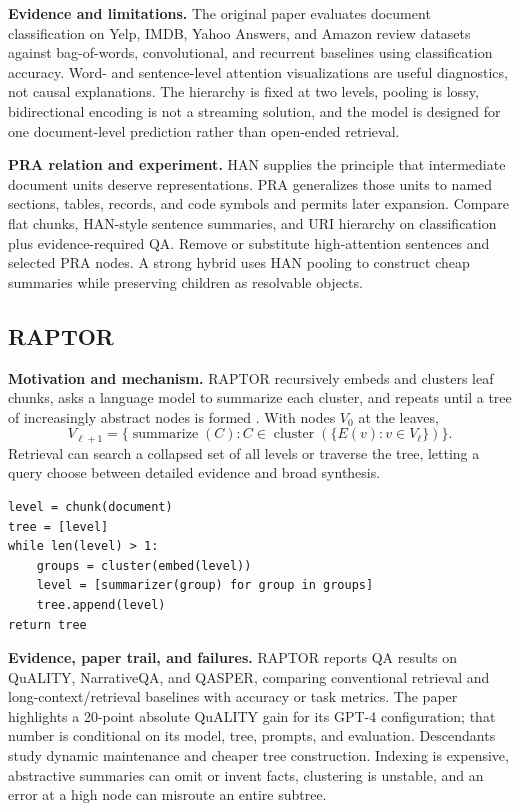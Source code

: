 \textbf{Evidence and limitations.} The original paper evaluates document classification on
Yelp, IMDB, Yahoo Answers, and Amazon review datasets against bag-of-words, convolutional,
and recurrent baselines using classification accuracy.  Word- and sentence-level attention
visualizations are useful diagnostics, not causal explanations.  The hierarchy is fixed at
two levels, pooling is lossy, bidirectional encoding is not a streaming solution, and the
model is designed for one document-level prediction rather than open-ended retrieval.

\textbf{PRA relation and experiment.} HAN supplies the principle that intermediate document
units deserve representations.  PRA generalizes those units to named sections, tables,
records, and code symbols and permits later expansion.  Compare flat chunks, HAN-style
sentence summaries, and URI hierarchy on classification plus evidence-required QA.  Remove
or substitute high-attention sentences and selected PRA nodes.  A strong hybrid uses HAN
pooling to construct cheap summaries while preserving children as resolvable objects.

\subsection{RAPTOR}

\textbf{Motivation and mechanism.} RAPTOR recursively embeds and clusters leaf chunks, asks
a language model to summarize each cluster, and repeats until a tree of increasingly abstract
nodes is formed \citep{sarthi2024raptor}.  With nodes $V_0$ at the leaves,
\begin{equation}
V_{\ell+1}=\{\operatorname{summarize}(C):
C\in\operatorname{cluster}(\{E(v):v\in V_\ell\})\}.
\end{equation}
Retrieval can search a collapsed set of all levels or traverse the tree, letting a query
choose between detailed evidence and broad synthesis.

\begin{lstlisting}[caption={Bottom-up RAPTOR index construction}]
level = chunk(document)
tree = [level]
while len(level) > 1:
    groups = cluster(embed(level))
    level = [summarizer(group) for group in groups]
    tree.append(level)
return tree
\end{lstlisting}

\textbf{Evidence, paper trail, and failures.} RAPTOR reports QA results on QuALITY,
NarrativeQA, and QASPER, comparing conventional retrieval and long-context/retrieval
baselines with accuracy or task metrics.  The paper highlights a 20-point absolute QuALITY
gain for its GPT-4 configuration; that number is conditional on its model, tree, prompts,
and evaluation.  Descendants study dynamic maintenance and cheaper tree construction.
Indexing is expensive, abstractive summaries can omit or invent facts, clustering is unstable,
and an error at a high node can misroute an entire subtree.

